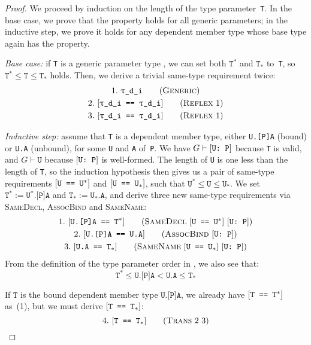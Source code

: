 \documentclass[../generics]{subfiles}
\begin{document}
\begin{proof}
We proceed by induction on the length of the type parameter~\texttt{T}. In the base case, we prove that the property holds for all generic parameters; in the inductive step, we prove it holds for any dependent member type whose base type again has the property.

\smallskip

\emph{Base case:} if \texttt{T} is a generic parameter type , we can set both $\texttt{T}^*$ and $\texttt{T}_*$ to~\texttt{T}, so $\texttt{T}^*\le\texttt{T}\le\texttt{T}_*$ holds. Then, we derive a trivial same-type requirement twice:
\begin{gather*}
\GenericStep{\ttgp{d}{i}}{1}\\
\ReflexStep{1}{\ttgp{d}{i}}{2}\\
\ReflexStep{1}{\ttgp{d}{i}}{3}
\end{gather*}

\emph{Inductive step:} assume that \texttt{T} is a dependent member type, either \texttt{U.[P]A} (bound) or \texttt{U.A} (unbound), for some \texttt{U} and \texttt{A} of~\texttt{P}. We have $G\vdash[\texttt{U:~P}]$ because \texttt{T} is valid, and $G\vdash\texttt{U}$ because $[\texttt{U:~P}]$ is well-formed. The length of \texttt{U} is one less than the length of \texttt{T}, so the induction hypothesis then gives us a pair of same-type requirements $[\texttt{U == $\texttt{U}^*$}]$ and $[\texttt{U == $\texttt{U}_*$}]$, such that $\texttt{U}^*\le\texttt{U}\le\texttt{U}_*$. We set $\texttt{T}^*:=\texttt{U}^*\texttt{.[P]A}$ and $\texttt{T}_*:=\texttt{U}_*\texttt{.A}$, and derive three new same-type requirements via \textsc{SameDecl}, \textsc{AssocBind} and \textsc{SameName}:
\begin{gather*}
\SameDeclStep{$\SameReq{U}{$\texttt{U}^*$}$}{$\ConfReq{U}{P}$}{U.[P]A}{$\texttt{T}^*$}{1}\\
\AssocBindStep{$\ConfReq{U}{P}$}{U.[P]A}{U.A}{2}\\
\SameNameStep{$\SameReq{U}{$\texttt{U}_*$}$}{$\ConfReq{U}{P}$}{U.A}{$\texttt{T}_*$}{3}
\end{gather*}
From the definition of the type parameter order in , we also see that:
\[\texttt{T}^*\le\texttt{U.[P]A}<\texttt{U.A}\le\texttt{T}_*\]

If $\texttt{T}$ is the bound dependent member type $\texttt{U.[P]A}$, we already have $[\texttt{T == $\texttt{T}^*$}]$ as~(1), but we must derive $[\texttt{T == $\texttt{T}_*$}]$:
\[
\TransStep{2}{3}{T}{$\texttt{T}_*$}{4}
\]


\end{proof}
\end{document}
